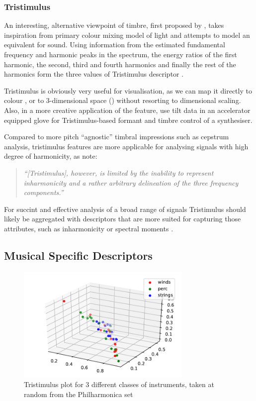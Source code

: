 {{{{\subsubsection{Tristimulus}

An interesting, alternative viewpoint of timbre, first proposed by \cite{Pollard1982}, takes inspiration from primary colour mixing model of light and attempts to model an equivalent for sound. Using information from the estimated fundamental frequency and harmonic peaks in the spectrum, the energy ratios of the first harmonic, the second, third and fourth harmonics and finally the rest of the harmonics form the three values of Tristimulus descriptor \citep{Peeters2004b}.

Tristimulus is obviously very useful for visualisation, as we can map it directly to colour \citep{Sequera2006}, or to 3-dimensional space  () without resorting to dimensional scaling. Also, in a more creative application of the feature, \cite{Fox2005a} use tilt data in an accelerator equipped glove for Tristimulus-based formant and timbre control of a synthesiser. 

Compared to more pitch ``agnostic'' timbral impressions such as cepstrum analysis, tristimulus features are more applicable for analysing signals with high degree of harmonicity, as \cite{Terasawa2006} note: 

\blockquote{\textit{
``[Tristimulus], however, is limited by the inability to represent inharmonicity and a rather arbitrary delineation of the three frequency components.''}
}

For succint and effective analysis of a broad range of signals Tristimulus should likely be aggregated with descriptors that are more suited for capturing those attributes, such as inharmonicity or spectral moments \citep{Peeters2004b,Chudy2010}.
 
\subsection{Musical Specific Descriptors}

\begin{figure}
	\begin{center}
		\includegraphics[width=0.75\textwidth]{ch05_pyconcat/figures/tristimulus.pdf}
	\end{center}
	\caption[Tristimulus plot for 3 different classes of instruments]{Tristimulus plot for 3 different classes of instruments, taken at random from the Philharmonica set}
	\label{fig:tristimulus}
\end{figure}

}}}}
